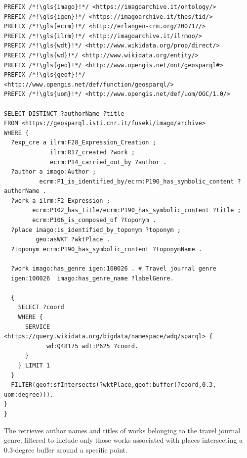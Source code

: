 \begin{lstlisting}[caption=GeoSPARQL Query 8, label={lst:query8}]
PREFIX /*!\gls{imago}!*/ <https://imagoarchive.it/ontology/>
PREFIX /*!\gls{igen}!*/ <https://imagoarchive.it/thes/tid/>
PREFIX /*!\gls{ecrm}!*/ <http://erlangen-crm.org/200717/>
PREFIX /*!\gls{ilrm}!*/ <http://imagoarchive.it/ilrmoo/>
PREFIX /*!\gls{wdt}!*/ <http://www.wikidata.org/prop/direct/>
PREFIX /*!\gls{wd}!*/ <http://www.wikidata.org/entity/>
PREFIX /*!\gls{geo}!*/ <http://www.opengis.net/ont/geosparql#>
PREFIX /*!\gls{geof}!*/ <http://www.opengis.net/def/function/geosparql/> 
PREFIX /*!\gls{uom}!*/ <http://www.opengis.net/def/uom/OGC/1.0/>

SELECT DISTINCT ?authorName ?title
FROM <https://geosparql.isti.cnr.it/fuseki/imago/archive>
WHERE {
  ?exp_cre a ilrm:F28_Expression_Creation ;
  		     ilrm:R17_created ?work ;
  		     ecrm:P14_carried_out_by ?author .	
  ?author a imago:Author ;
          ecrm:P1_is_identified_by/ecrm:P190_has_symbolic_content ?authorName .
  ?work a ilrm:F2_Expression ;
        ecrm:P102_has_title/ecrm:P190_has_symbolic_content ?title ;
        ecrm:P106_is_composed_of ?toponym . 
  ?place imago:is_identified_by_toponym ?toponym ;
         geo:asWKT ?wktPlace .
  ?toponym ecrm:P190_has_symbolic_content ?toponymName .
  
  ?work imago:has_genre igen:100026 . # Travel journal genre
  igen:100026  imago:has_genre_name ?labelGenre.
  
  { 
    SELECT ?coord 
    WHERE {
      SERVICE <https://query.wikidata.org/bigdata/namespace/wdq/sparql> { 
            wd:Q48175 wdt:P625 ?coord.    
      } 
    } LIMIT 1
  }
  FILTER(geof:sfIntersects(?wktPlace,geof:buffer(?coord,0.3, uom:degree))). 
}  
}  
\end{lstlisting}


The  retrieves author names and titles of works belonging to the travel journal genre, filtered to include only those works associated with places intersecting a 0.3-degree buffer around a specific point.

